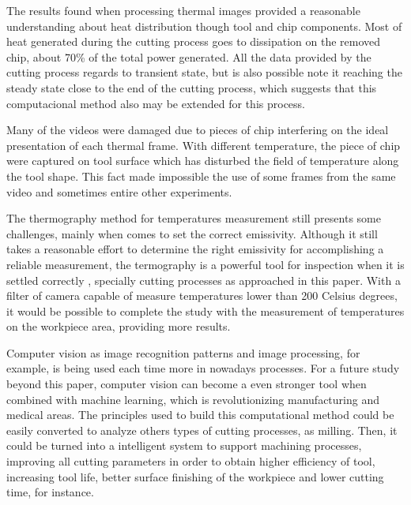 The results found when processing thermal images provided a reasonable understanding about heat distribution though tool and chip components. Most of heat generated during the cutting process goes to dissipation on the removed chip, about 70\% of the total power generated. All the data provided by the cutting process regards to transient state, but is also possible note it reaching the steady state close to the end of the cutting process, which suggests that this computacional method also may be extended for this process.

Many of the videos were damaged due to pieces of chip interfering on the ideal presentation of each thermal frame. With different temperature, the piece of chip were captured on tool surface which has disturbed the field of temperature along the tool shape. This fact made impossible the use of some frames from the same video and sometimes entire other experiments.

The thermography method for temperatures measurement still presents some challenges, mainly when comes to set the correct emissivity. Although it still takes a reasonable effort to determine the right emissivity for accomplishing a reliable measurement, the termography is a powerful tool for inspection when it is settled correctly , specially cutting processes as approached in this paper. With a filter of camera capable of measure temperatures lower than 200 Celsius degrees, it would be possible to complete the study with the measurement of temperatures on the workpiece area, providing more results.

Computer vision as image recognition patterns and image processing, for example, is being used each time more in nowadays processes. For a future study beyond this paper, computer vision can become a even stronger tool when combined with machine learning, which is revolutionizing manufacturing and medical areas. The principles used to build this computational method could be easily converted to analyze others types of cutting processes, as milling. Then, it could be turned into a intelligent system to support machining processes, improving all cutting parameters in order to obtain higher efficiency of tool, increasing tool life, better surface finishing of the workpiece and lower cutting time, for instance.